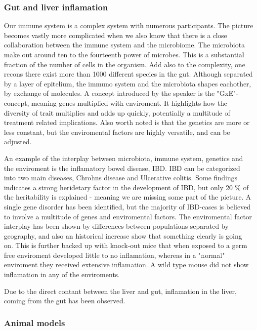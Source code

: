 \documentclass[12p]{article}
\begin{document}
\subsubsection{Gut and liver inflamation}

Our immune system is a complex system with numerous participants.
The picture becomes vastly more complicated when we also know that there is a close collaboration between the immune system and the microbiome.
The microbiota make out around ten to the fourteenth power of microbes.
This is a substantial fraction of the number of cells in the organism.
Add also to the complexity, one recons there exist more than 1000 different species in the gut.
Although separated by a layer of epitelium, the immuno system and the microbiota shapes eachother, by exchange of molecules.
A concept introduced by the speaker is the "GxE"-concept, meaning genes multiplied with enviroment.
It highlights how the diversity of trait multiplies and adds up quickly, potentially a multitude of treatment related implications.
Also worth noted is that the genetics are more or less constant, but the enviromental factors are highly versatile, and can be adjusted.

An example of the interplay between microbiota, immune system, genetics and the enviroment is the inflamatory bowel disease, IBD.
IBD can be categorized into two main diseases, Chrohns disease and Ulcerative colitis.
Some findings indicates a strong heridetary factor in the development of IBD, but only 20 \% of the heritability is explained - meaning we are missing some part of the picture.
A single gene disorder has been identified, but the majority of IBD-cases is believed to involve a multitude of genes and enviromental factors.
The enviromental factor interplay has been shown by differences between populations separated by geography, and also an historical increase show that something clearly is going on.
This is further backed up with knock-out mice that when exposed to a germ free enviroment developed little to no inflamation, whereas in a "normal" enviroment they received extensive inflamation.
A wild type mouse did not show inflamation in any of the enviroments.

Due to the direct contant between the liver and gut, inflamation in the liver, coming from the gut has been observed.

\subsubsection{Animal models}
\end{document}
